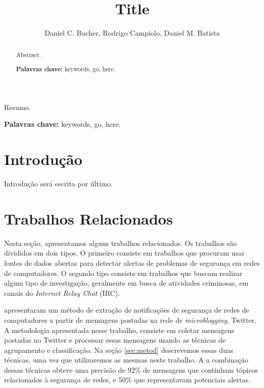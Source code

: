 \documentclass[12pt]{article}
\title{Title}
\author {Daniel C. Bucher\inst{1}, Rodrigo Campiolo\inst{1,2}, Daniel M. Batista\inst{1} }
\begin{document}
\maketitle

\begin{resumo}
  Resumo.

\textbf{Palavras chave:} keywords, go, here.

\end{resumo}

\begin{abstract}
  Abstract.

\textbf{Palavras chave:} keywords, go, here.

\end{abstract}

\section{Introdução} \label{sec:intro}

Introdução será escrita por último.

\section{Trabalhos Relacionados} \label{sec:rel}

Nesta seção, apresentamos alguns trabalhos relacionados. Os trabalhos são
divididos em dois tipos. O primeiro consiste em trabalhos que procuram usar fontes de
dados abertas para detectar alertas de problemas de segurança em redes de
computadores. O segundo tipo consiste em trabalhos que buscam realizar algum
tipo de investigação, geralmente em busca de atividades criminosas, em canais do
\textit{Internet Relay Chat} (IRC).

\cite{santos2013} apresentaram um método de extração de notificações de
segurança de redes de computadores a partir de mensagens postadas na rede de
\textit{microblogging}, Twitter.
%
A metodologia apresentada nesse trabalho, consiste em coletar mensagens
postadas no Twitter e processar essas mensagens usando as técnicas de
agrupamento e classificação. Na seção \ref{sec:metod} descrevemos essas duas
técnicas, uma vez que utilizaremos as mesmas neste trabalho.
%
A a combinação dessas técnicas obteve uma precisão de 92\% de mensagens
que continham tópicos relacionados à segurança de redes, e 50\% que
representavam potenciais alertas.
\end{document}
